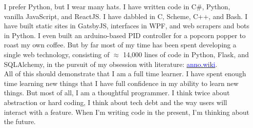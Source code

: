 \documentclass[9pt]{developercv} %
\begin{document}



    I prefer Python, but I wear many hats. I have written code in C\#,
    Python, vanilla JavaScript, and ReactJS. I have dabbled in C, Scheme, C++,
    and Bash. I have built static sites in GatsbyJS, interfaces in WPF, and web
    scrapers and bots in Python. I even built an arduino-based PID controller
    for a popcorn popper to roast my own coffee. But by far most of my time has
    been spent developing a single web technology, consisting of $\approx$
    14,000 lines of code in Python, Flask, and SQLAlchemy, in the pursuit of my
    obsession with literature:
    {\href{https://github.com/malan88/icc}{\textcolor{Blue}{anno.wiki}}}.\\

    All of this should demonstrate that I am a full time learner. I have spent
    enough time learning new things that I have full confidence in my ability to
    learn new things. But most of all, I am a thoughtful programmer. I think
    twice about abstraction or hard coding, I think about tech debt and the way
    users will interact with a feature. When I'm writing code in the present,
    I'm thinking about the future.


\end{document}

